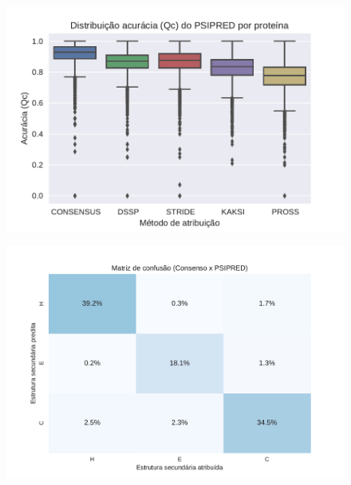 \begin{figure}
    \includegraphics[width=\linewidth]{../figures/psipred_qc.pdf}
    \caption{}
    \label{fig:psipred_qc}
\end{figure}

\begin{figure}
    \includegraphics[width=\linewidth]{../figures/psipred_all3_confusion_matrix.pdf}
    \caption{}
    \label{fig:psipred_all3_confusion_matrix}
\end{figure}

